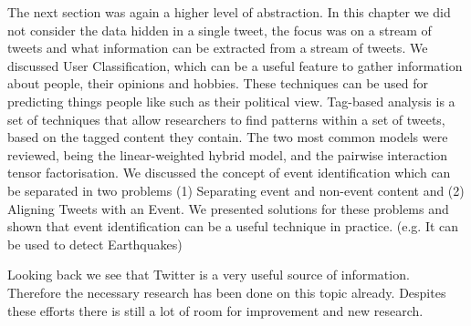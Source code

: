 \documentclass{article}
\begin{document}
The next section was again a higher level of abstraction. In this chapter we did not consider the data hidden in a single tweet, the focus was on a stream 
of tweets and what information can be extracted from a stream of tweets. We discussed User Classification, which can be a useful feature to gather information 
about people, their opinions and hobbies. These techniques can be used for predicting things people like such as their political view. Tag-based analysis is
a set of techniques that allow researchers to find patterns within a set of tweets, based on the tagged content they contain. The two most common models
were reviewed, being the linear-weighted hybrid model, and the pairwise interaction tensor factorisation. We discussed the 
concept of event identification which can be separated in two problems (1) Separating event and non-event content and (2) Aligning Tweets with an Event. We presented solutions for these problems and shown that event identification can be a useful technique in practice. (e.g. It can be used to detect Earthquakes)

Looking back we see that Twitter is a very useful source of information. Therefore the necessary research has been done on this topic already. Despites these efforts there is still a lot of room for improvement and new research. 
\newpage


\end{document}
